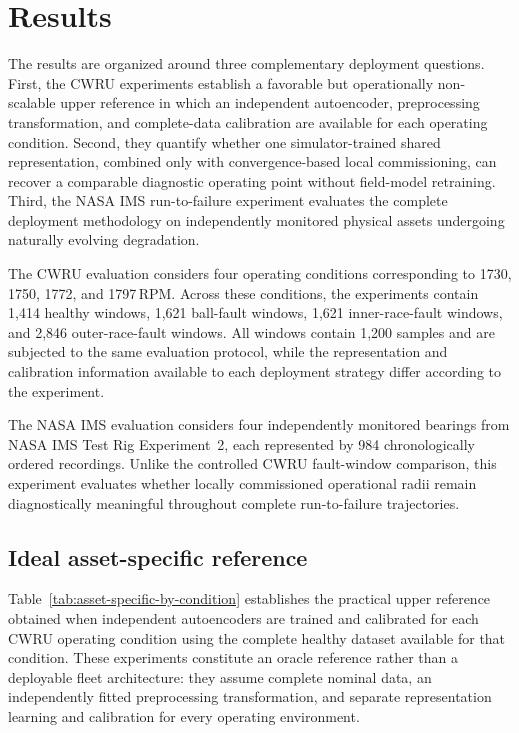 \documentclass[numbered]{trbunofficial}
\begin{document}
\section{Results}
\label{sec:results}

The results are organized around three complementary deployment questions.
First, the CWRU experiments establish a favorable but operationally
non-scalable upper reference in which an independent autoencoder,
preprocessing transformation, and complete-data calibration are available
for each operating condition. Second, they quantify whether one
simulator-trained shared representation, combined only with
convergence-based local commissioning, can recover a comparable diagnostic
operating point without field-model retraining. Third, the NASA IMS
run-to-failure experiment evaluates the complete deployment methodology on
independently monitored physical assets undergoing naturally evolving
degradation.

The CWRU evaluation considers four operating conditions corresponding to
1730, 1750, 1772, and 1797\,RPM. Across these conditions, the experiments
contain 1,414 healthy windows, 1,621 ball-fault windows, 1,621
inner-race-fault windows, and 2,846 outer-race-fault windows. All windows
contain 1,200 samples and are subjected to the same evaluation protocol,
while the representation and calibration information available to each
deployment strategy differ according to the experiment.

The NASA IMS evaluation considers four independently monitored bearings
from NASA IMS Test Rig Experiment~2, each represented by 984
chronologically ordered recordings.
Unlike the controlled CWRU fault-window comparison, this experiment evaluates
whether locally commissioned operational radii remain diagnostically
meaningful throughout complete run-to-failure trajectories.

\subsection{Ideal asset-specific reference}
\label{sec:oracle-results}

Table~\ref{tab:asset-specific-by-condition} establishes the practical
upper reference obtained when independent autoencoders are trained and
calibrated for each CWRU operating condition using the complete healthy
dataset available for that condition. These experiments
constitute an oracle reference rather than a deployable fleet architecture:
they assume complete nominal data, an independently fitted preprocessing
transformation, and separate representation learning and calibration for
every operating environment.
\end{document}
